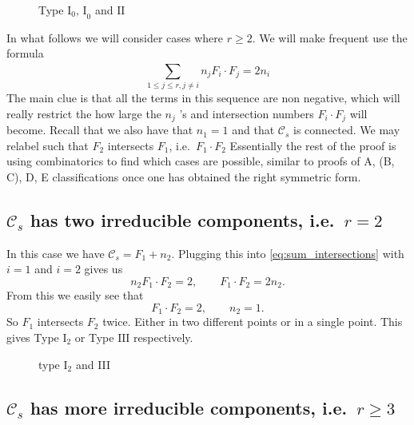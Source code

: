 \begin{figure}[ht]
    \centering
    \caption{Type $\text{I}_0 \text{, I}_0$ and $\text{II}$}
    \label{fig:type-i2-iii}
\end{figure}

\bigskip
In what follows we will consider cases where $r \ge 2$. We will make frequent use the formula 
\begin{equation}\label{eq:sum_intersections}
	\sum_{1 \le j \le r, j \ne i}^{} n_j F_i \cdot F_j = 2 n_i
\end{equation}
The main clue is that all the terms in this sequence are non negative, which will really restrict the how large the $n_j$ 's and intersection numbers  $F_i \cdot  F_j$ will become.
Recall that we also have that $n_1 = 1$ and that $\mathcal{C} _s$ is connected. We may relabel such that $F_2$ intersects $F_1$, i.e.\  $F_1 \cdot F_2 $ 
Essentially the rest of the proof is using combinatorics to find which cases are possible, similar to proofs of A, (B, C), D, E classifications once one has obtained the right symmetric form.  



\subsection{$\mathcal{C} _s$ has two irreducible components, i.e.\ $r  = 2$} \label{sec:C_s_has_two_irreducible_components}
In this case we have $\mathcal{C} _s = F_1 + n_2$. 
Plugging this into \eqref{eq:sum_intersections} with $i = 1$ and  $i = 2$ gives us \[
n_2 F_1 \cdot F_2 = 2, \qquad F_1 \cdot F_2 = 2 n_2
.\] 
From this we easily see that 
 \[
F_1 \cdot F_2 = 2, \qquad n_2 = 1
.\] 
So $F_1$ intersects $F_2$ twice. Either in two different points or in a single point. This gives Type  $\text{I}_2$ or Type $\text{III}$ respectively. 

\begin{figure}[ht]
    \centering
    \caption{type $\text{I}_2$ and III}
    \label{fig:type-i-and-iii}
\end{figure}


\subsection{$\mathcal{C} _s$ has more irreducible components, i.e.\ $r \ge 3$} \label{sec:S_s_has_more_irreducible_components}

